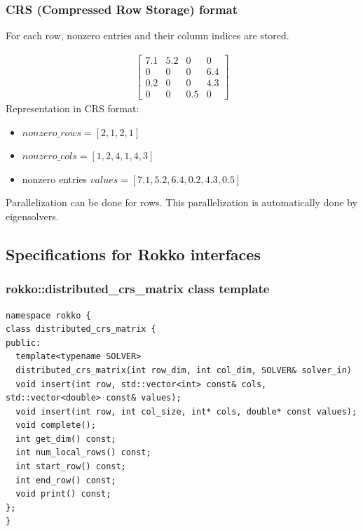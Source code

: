 \begin{frame}[c,fragile]
  \frametitle{CRS (Compressed Row Storage) format}
For each row, nonzero entries and their column indices are stored.

\begin{rei}%
\vspace{-2\baselineskip}
\begin{align*}
\begin{bmatrix}
7.1 & 5.2 & 0 & 0 \\
0 & 0 & 0 & 6.4 \\
0.2 & 0 & 0 & 4.3 \\
0 & 0 & 0.5 & 0
\end{bmatrix}
\end{align*}
Representation in CRS format:
\begin{itemize}
\item $nonzero\_rows = [2, 1, 2, 1]$
\item $nonzero\_cols = [1, 2, 4, 1, 4, 3]$
\item nonzero entries $values = [7.1, 5.2, 6.4, 0.2, 4.3, 0.5]$
\end{itemize}
\end{rei}

Parallelization can be done for rows.
This parallelization is automatically done by eigensolvers.

\end{frame}

\subsection{Specifications for Rokko interfaces}

\begin{frame}[c,fragile]
  \frametitle{rokko::distributed_crs_matrix class template}
\begin{lstlisting}
namespace rokko {
class distributed_crs_matrix {
public:
  template<typename SOLVER>
  distributed_crs_matrix(int row_dim, int col_dim, SOLVER& solver_in)
  void insert(int row, std::vector<int> const& cols, std::vector<double> const& values);
  void insert(int row, int col_size, int* cols, double* const values);
  void complete();
  int get_dim() const;
  int num_local_rows() const;
  int start_row() const;
  int end_row() const;
  void print() const;
};
}
\end{lstlisting}
\end{frame}


